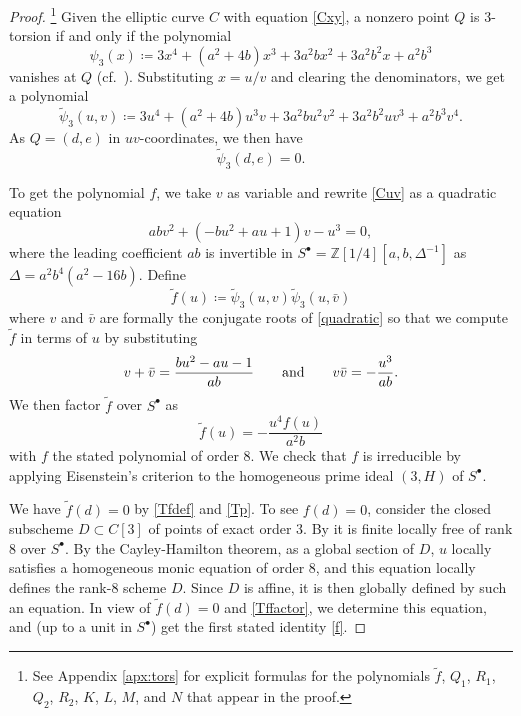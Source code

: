 \documentclass{gtpart}
\theoremstyle{definition}
\theoremstyle{remark}
\newcommand{\mb}[1]{\mathbb{#1}}
\newcommand{\BZ}{{\mb Z}}
\newcommand{\Tf}{\widetilde{f}}
\newcommand{\Tp}{\widetilde{\psi}}
\newcommand{\ad}{{\rm and}}
\newcommand{\s}{S^\bullet}
\begin{document}
\begin{proof}
 \footnote{See Appendix \ref{apx:tors} for explicit formulas for the 
 polynomials $\Tf$, $Q_1$, $R_1$, $Q_2$, $R_2$, $K$, $L$, $M$, and $N$ 
 that appear in the proof.  }
 Given the elliptic curve $C$ with equation \eqref{Cxy}, a nonzero point 
 $Q$ is 3-torsion if and only if the polynomial 
 \[
  \psi_3 (x) \coloneqq 3 x^4 + (a^2 + 4 b) x^3 + 3 a^2 b x^2 + 3 a^2 b^2 x + a^2 b^3 
 \]
 vanishes at $Q$ (cf.~\cite[Exercise 3.7f]{AEC}).  Substituting 
 $x = u / v$ and clearing the denominators, we get a polynomial 
 \[
  \Tp_3(u,v) \coloneqq 3 u^4 + (a^2 + 4 b) u^3 v + 3 a^2 b u^2 v^2 + 3 a^2 b^2 u v^3 + a^2 b^3 v^4.  
 \]
 As $Q = (d,e)$ in $uv$-coordinates, we then have 
 \begin{equation}
 \label{Tp}
  \Tp_3(d,e) = 0.  
 \end{equation}

 To get the polynomial $f$, we take $v$ as variable and rewrite 
 \eqref{Cuv} as a quadratic equation 
 \begin{equation}
 \label{quadratic}
  a b v^2 + (-b u^2 + a u + 1) v - u^3 = 0, 
 \end{equation}
 where the leading coefficient $a b$ is invertible in 
 $\s = \BZ [1/4] [a, b, \Delta^{-1}]$ as $\Delta = a^2 b^4 (a^2 - 16 b)$.  
 Define 
 \begin{equation}
 \label{Tfdef}
  \Tf(u) \coloneqq \Tp_3(u,v) \Tp_3(u,\bar{v}) 
 \end{equation}
 where $v$ and $\bar{v}$ are formally the conjugate roots of 
 \eqref{quadratic} so that we compute $\Tf$ in terms of $u$ by 
 substituting 
 \[
  v + \bar{v} = \frac{b u^2 - a u - 1}{a b} \qquad \ad \qquad v \bar{v} = -\frac{u^3}{a b}.  
 \]
 We then factor $\Tf$ over $\s$ as 
 \begin{equation}
 \label{Tffactor}
  \Tf(u) = -\frac{u^4 f(u)}{a^2 b} 
 \end{equation}
 with $f$ the stated polynomial of order 8.  We check that $f$ is 
 irreducible by applying Eisenstein's criterion to the homogeneous prime 
 ideal $(3,H)$ of $\s$.  

 We have $\Tf(d) = 0$ by \eqref{Tfdef} and \eqref{Tp}.  To see 
 $f(d) = 0$, consider the closed subscheme $D \subset C[3]$ of points of 
 exact order 3.  By \cite[2.3.1]{KM} it is finite locally free of rank 8 
 over $\s$.  By the Cayley-Hamilton theorem, as a global section of $D$, 
 $u$ locally satisfies a homogeneous monic equation of order 8, and this 
 equation locally defines the rank-8 scheme $D$.  Since $D$ is affine, 
 it is then globally defined by such an equation.  In view of 
 $\Tf(d) = 0$ and \eqref{Tffactor}, we determine this equation, and (up 
 to a unit in $\s$) get the first stated identity \eqref{f}.  


\end{proof}
\end{document}
